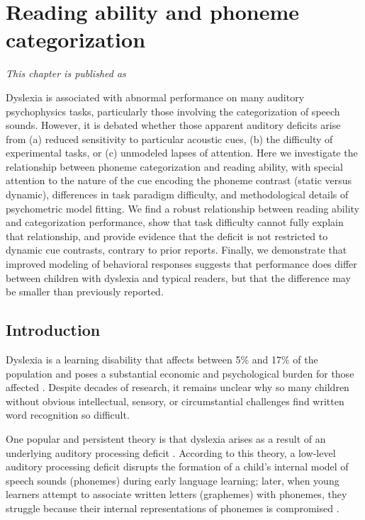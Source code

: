 \documentclass[../uwthesis.tex]{subfiles}
\begin{document}
\chapter{Reading ability and phoneme categorization}
\emph{This chapter is published as \cite{OBrien2018}}

 
Dyslexia is associated with abnormal performance on many auditory psychophysics tasks, particularly those involving the categorization of speech sounds. However, it is debated whether those apparent auditory deficits arise from (a) reduced sensitivity to particular acoustic cues, (b) the difficulty of experimental tasks, or (c) unmodeled lapses of attention. Here we investigate the relationship between phoneme categorization and reading ability, with special attention to the nature of the cue encoding the phoneme contrast (static versus dynamic), differences in task paradigm difficulty, and methodological details of psychometric model fitting. We find a robust relationship between reading ability and categorization performance, show that task difficulty cannot fully explain that relationship, and provide evidence that the deficit is not restricted to dynamic cue contrasts, contrary to prior reports. Finally, we demonstrate that improved modeling of behavioral responses suggests that performance does differ between children with dyslexia and typical readers, but that the difference may be smaller than previously reported.
 
\section{Introduction}

Dyslexia is a learning disability that affects between 5\% and 17\% of the population and poses a substantial economic and psychological burden for those affected \cite{Lyon2003,Shaywitz1998,Snowling2000}. Despite decades of research, it remains unclear why so many children without obvious intellectual, sensory, or circumstantial challenges find written word recognition so difficult.

One popular and persistent theory is that dyslexia arises as a result of an underlying auditory processing deficit \cite{Farmer1995,Goswami2011,VanIngelghem2005,Snowling1998,Steinbrink2014,Tallal1980}. According to this theory, a low-level auditory processing deficit disrupts the formation of a child's internal model of speech sounds (phonemes) during early language learning; later, when young learners attempt to associate written letters (graphemes) with phonemes, they struggle because their internal representations of phonemes is compromised \cite{Poelmans2011}. 
\end{document}
